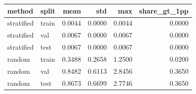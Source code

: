 \begin{tabular}{llrrrr}
\toprule
method & split & mean & std & max & share\_gt\_1pp \\
\midrule
stratified & train & 0.0044 & 0.0000 & 0.0044 & 0.0000 \\
stratified & val & 0.0067 & 0.0000 & 0.0067 & 0.0000 \\
stratified & test & 0.0067 & 0.0000 & 0.0067 & 0.0000 \\
random & train & 0.3488 & 0.2658 & 1.2500 & 0.0200 \\
random & val & 0.8482 & 0.6113 & 2.8456 & 0.3650 \\
random & test & 0.8673 & 0.6699 & 2.7746 & 0.3650 \\
\bottomrule
\end{tabular}
